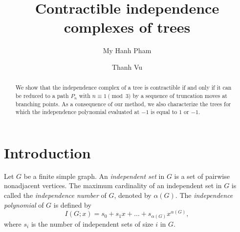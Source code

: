 \documentclass[12pt,amscd]{amsart}
\theoremstyle{definition}
\numberwithin{equation}{section}
\begin{document}
\title{Contractible independence complexes of trees}



\author[My Hanh Pham]{My Hanh Pham}
\address{Faculty of Education, An Giang University\\Vietnam National University Ho Chi Minh City\\ Long Xuyen, An Giang, Vietnam}


\author{Thanh Vu}
\address{Institute of Mathematics, VAST, 18 Hoang Quoc Viet, Hanoi, Vietnam}




\date{}



\commby{}

\begin{abstract}
   We show that the independence complex of a tree is contractible if and only if it can be reduced to a path \( P_n \) with \( n \equiv 1 \pmod{3} \) by a sequence of truncation moves at branching points. As a consequence of our method, we also characterize the trees for which the independence polynomial evaluated at \( -1 \) is equal to \( 1 \) or \( -1 \).
\end{abstract}

\maketitle

\section{Introduction}
\label{sect_intro}

Let \( G \) be a finite simple graph. An \textit{independent set} in \( G \) is a set of pairwise nonadjacent vertices. The maximum cardinality of an independent set in \( G \) is called the \textit{independence number} of \( G \), denoted by \( \alpha(G) \). The \textit{independence polynomial} of \( G \) is defined by
\[
I(G;x) = s_0 + s_1 x + \dots + s_{\alpha(G)} x^{\alpha(G)},
\]
where \( s_i \) is the number of independent sets of size \( i \) in \( G \).
\end{document}
